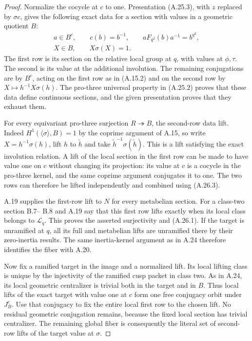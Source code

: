 \begin{proof}
Normalize the cocycle at $c$ to one. Presentation
(A.25.3), with $z$ replaced by $\sigma c$, gives
the following exact data for a section with values
in a geometric quotient $B$:
\[
 \begin{gathered}
 a\in B^c,\qquad c(b)=b^{-1},\qquad
 aF_{q^2}(b)a^{-1}=b^{q^2},\\
 X\in B,\qquad X\sigma(X)=1.
 \end{gathered}
 \tag{A.26.3}
\]
The first row is its section on the relative local
group at $q$, with values at $\phi,\tau$. The
second is its value at the additional involution.
The remaining conjugations are by $B^c$, acting
on the first row as in (A.15.2) and on the
second row by $X\mapsto h^{-1}X\sigma(h)$.
The pro-three universal property in (A.25.2)
proves that these data define continuous sections,
and the given presentation proves that they
exhaust them.

For every equivariant pro-three surjection
$R\twoheadrightarrow B$, the second-row data
lift. Indeed $H^1(\langle\sigma\rangle,B)=1$
by the coprime argument of A.15, so write
$X=h^{-1}\sigma(h)$, lift $h$ to $\widetilde h$
and take $\widetilde h^{-1}\sigma(\widetilde h)$.
This is a lift satisfying the exact involution
relation. A lift of the local section in the
first row can be made to have value one on $c$
without changing its projection: its value at
$c$ is a cocycle in the pro-three kernel, and
the same coprime argument conjugates it to one.
The two rows can therefore be lifted independently
and combined using (A.26.3).

A.19 supplies the first-row lift to $N$ for every
metabelian section. For a class-two section B.7--
B.8 and A.19 say that this first row lifts exactly
when its local class belongs to $\mathscr L_q$.
This proves the asserted surjectivity and
(A.26.1). If the target is unramified at $q$,
all its full and metabelian lifts are unramified
there by their zero-inertia results. The same
inertia-kernel argument as in A.24 therefore
identifies the fiber with A.20.

Now fix a ramified target in the image and a
normalized lift. Its local lifting class is
unique by the injectivity of the ramified cusp
packet in class two. As in A.24, its local
geometric centralizer is trivial both in the
target and in $B$. Thus local lifts of the
exact target with value one at $c$ form one
free conjugacy orbit under $J_B^c$.
Use that conjugacy to fix the entire local
first row to the chosen lift. No residual
geometric conjugation remains, because the
fixed local section has trivial centralizer.
The remaining global fiber is consequently
the literal set of second-row lifts of the
target value at $\sigma$.


\end{proof}
